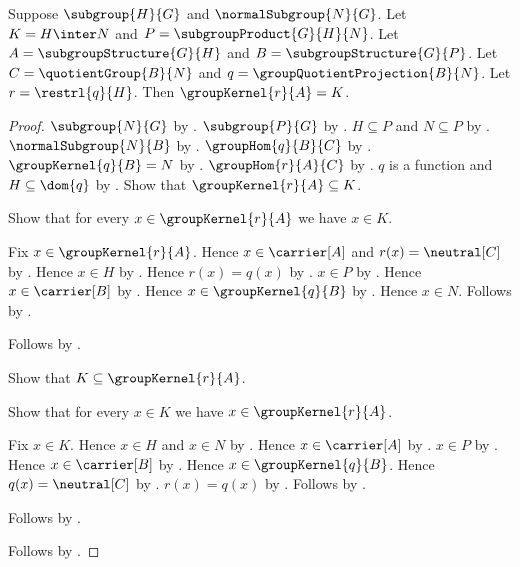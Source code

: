 \begin{theorem}\label{group_second_isomorphism_restriction_kernel}
    Suppose $\subgroup{H}{G}$ and $\normalSubgroup{N}{G}$.
    Let $K=H\inter N$ and $P=\subgroupProduct{G}{H}{N}$.
    Let $A=\subgroupStructure{G}{H}$ and
        $B=\subgroupStructure{G}{P}$.
    Let $C=\quotientGroup{B}{N}$ and
        $q=\groupQuotientProjection{B}{N}$.
    Let $r=\restrl{q}{H}$.
    Then $\groupKernel{r}{A}=K$.
\end{theorem}
\begin{proof}
    $\subgroup{N}{G}$ by .
    $\subgroup{P}{G}$ by .
    $H\subseteq P$ and $N\subseteq P$ by
        .
    $\normalSubgroup{N}{B}$ by
        .
    $\groupHom{q}{B}{C}$ by
        .
    $\groupKernel{q}{B}=N$ by
        .
    $\groupHom{r}{A}{C}$ by
        .
    $q$ is a function and $H\subseteq\dom{q}$ by
        .
    Show that $\groupKernel{r}{A}\subseteq K$.
    \begin{subproof}
        Show that for every $x\in\groupKernel{r}{A}$ we have
            $x\in K$.
        \begin{subproof}
            Fix $x\in\groupKernel{r}{A}$.
            Hence $x\in\carrier[A]$ and $r(x)=\neutral[C]$ by
                .
            Hence $x\in H$ by .
            Hence $r(x)=q(x)$ by
                .
            $x\in P$ by .
            Hence $x\in\carrier[B]$ by
                .
            Hence $x\in\groupKernel{q}{B}$ by
                .
            Hence $x\in N$.
            Follows by .
        \end{subproof}
        Follows by .
    \end{subproof}
    Show that $K\subseteq\groupKernel{r}{A}$.
    \begin{subproof}
        Show that for every $x\in K$ we have
            $x\in\groupKernel{r}{A}$.
        \begin{subproof}
            Fix $x\in K$.
            Hence $x\in H$ and $x\in N$ by
                .
            Hence $x\in\carrier[A]$ by
                .
            $x\in P$ by .
            Hence $x\in\carrier[B]$ by
                .
            Hence $x\in\groupKernel{q}{B}$.
            Hence $q(x)=\neutral[C]$ by
                .
            $r(x)=q(x)$ by .
            Follows by .
        \end{subproof}
        Follows by .
    \end{subproof}
    Follows by .
\end{proof}

